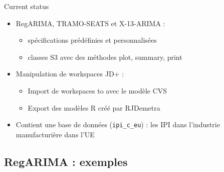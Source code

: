 \documentclass[10pt,xcolor=table,color={dvipsnames,usenames},ignorenonframetext,usepdftitle=false,french]{beamer}
\providecommand{\tightlist}{%
  \setlength{\parskip}{0pt}
  }
\begin{document}
\begin{frame}[fragile]{Current status}
\protect\hypertarget{current-status-1}{}

\begin{itemize}
\tightlist
\item
  RegARIMA, TRAMO-SEATS et X-13-ARIMA :

  \begin{itemize}
  \tightlist
  \item
    spécifications prédéfinies et personnalisées
  \item
    classes S3 avec des méthodes plot, summary, print
  \end{itemize}
\end{itemize}

\medskip

\begin{itemize}
\tightlist
\item
  Manipulation de workspaces JD+ :

  \begin{itemize}
  \tightlist
  \item
    Import de workspaces to avec le modèle CVS
  \item
    Export des modèles R créé par RJDemetra
  \end{itemize}
\end{itemize}

\medskip

\begin{itemize}
\tightlist
\item
  Contient une base de données (\texttt{ipi\_c\_eu}) : les IPI dans
  l'industrie manufacturière dans l'UE
\end{itemize}

\end{frame}

\hypertarget{regarima-exemples}{%
\subsection{RegARIMA : exemples}\label{regarima-exemples}}
\end{document}
